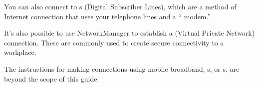 You can also connect to s (Digital Subscriber Lines), 
which are a method of Internet connection that uses your telephone lines 
and a `` modem.'' 

It's also possible to use NetworkManager to establish a  (Virtual Private Network) 
connection. These are commonly used to create secure connectivity to a 
workplace. 

The instructions for making connections using mobile broadband, s, or s, are beyond the scope of this guide.

